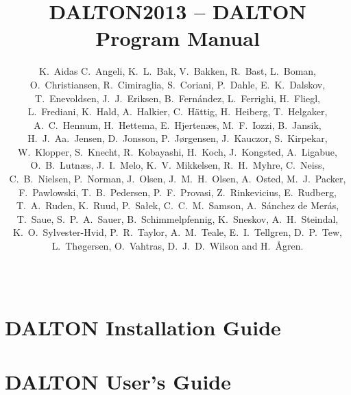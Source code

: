 \documentclass[11pt]{report}
\begin{document}
\nobibliography*
%
%
\baselineskip=15pt
%
\title{DALTON2013 -- DALTON Program Manual}

%
\author{
K.~Aidas
C.~Angeli,
K.~L.~Bak,
V.~Bakken,
R.~Bast,
L.~Boman,\\
O.~Christiansen,
R.~Cimiraglia,
S.~Coriani,
P.~Dahle,
E.~K.~Dalskov,\\
T.~Enevoldsen,
J.~J.~Eriksen,
B.~Fern\'{a}ndez,
L.~Ferrighi,
H.~Fliegl,\\
L.~Frediani,
K.~Hald,
A.~Halkier,
C.~H{\"a}ttig,
H.~Heiberg,
T.~Helgaker,\\
A.~C.~Hennum,
H.~Hettema,
E.~Hjerten\ae{}s,
M.~F.~Iozzi,
B.~Jansik,\\
H.~J.~Aa.~Jensen,
D.~Jonsson,
P.~J{\o}rgensen,
J.~Kauczor,
S.~Kirpekar,\\
W.~Klopper,
S.~Knecht,
R.~Kobayashi,
H.~Koch,
J.~Kongsted,
A.~Ligabue,\\
O.~B.~Lutn\ae{}s,
J.~I.~Melo,
K.~V.~Mikkelsen,
R.~H.~Myhre,
C.~Neiss,\\
C.~B.~Nielsen,
P.~Norman,
J.~Olsen,
J.~M.~H.~Olsen,
A.~Osted,
M.~J.~Packer,\\
F.~Pawlowski,
T.~B.~Pedersen,
P.~F.~Provasi,
Z.~Rinkevicius,
E.~Rudberg,\\
T.~A.~Ruden,
K.~Ruud,
P.~Sa\l{}ek,
C.~C.~M.~Samson,
A.~S\'{a}nchez de Mer\'{a}s,\\
T.~Saue,
S.~P.~A.~Sauer,
B.~Schimmelpfennig,
K.~Sneskov,
A.~H.~Steindal,\\
K.~O.~Sylvester-Hvid,
P.~R.~Taylor,
A.~M.~Teale,
E.~I.~Tellgren,
D.~P.~Tew,\\
L.~Th\o{}gersen,
O.~Vahtras,
D.~J.~D.~Wilson
and H.~{\AA}gren.
}
%
\date{\mbox{\ }}
%
\maketitle
%



\part{DALTON Installation Guide}


\part{DALTON User's Guide}



















\end{document}
